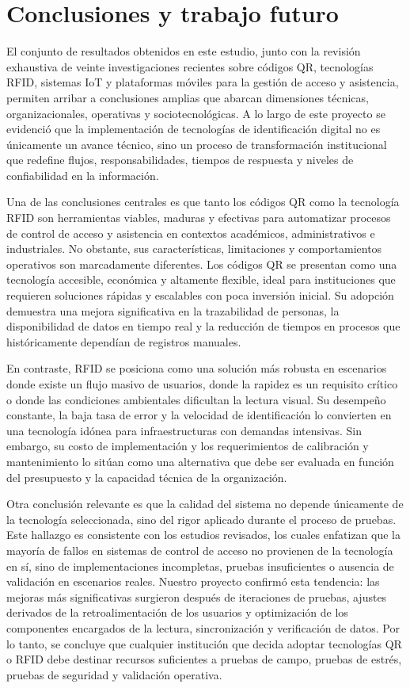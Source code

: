 \section{Conclusiones y trabajo futuro}
El conjunto de resultados obtenidos en este estudio, junto con la revisión exhaustiva de veinte investigaciones recientes sobre códigos QR, tecnologías RFID, sistemas IoT y plataformas móviles para la gestión de acceso y asistencia, permiten arribar a conclusiones amplias que abarcan dimensiones técnicas, organizacionales, operativas y sociotecnológicas. A lo largo de este proyecto se evidenció que la implementación de tecnologías de identificación digital no es únicamente un avance técnico, sino un proceso de transformación institucional que redefine flujos, responsabilidades, tiempos de respuesta y niveles de confiabilidad en la información.

Una de las conclusiones centrales es que tanto los códigos QR como la tecnología RFID son herramientas viables, maduras y efectivas para automatizar procesos de control de acceso y asistencia en contextos académicos, administrativos e industriales. No obstante, sus características, limitaciones y comportamientos operativos son marcadamente diferentes. Los códigos QR se presentan como una tecnología accesible, económica y altamente flexible, ideal para instituciones que requieren soluciones rápidas y escalables con poca inversión inicial. Su adopción demuestra una mejora significativa en la trazabilidad de personas, la disponibilidad de datos en tiempo real y la reducción de tiempos en procesos que históricamente dependían de registros manuales.

En contraste, RFID se posiciona como una solución más robusta en escenarios donde existe un flujo masivo de usuarios, donde la rapidez es un requisito crítico o donde las condiciones ambientales dificultan la lectura visual. Su desempeño constante, la baja tasa de error y la velocidad de identificación lo convierten en una tecnología idónea para infraestructuras con demandas intensivas. Sin embargo, su costo de implementación y los requerimientos de calibración y mantenimiento lo sitúan como una alternativa que debe ser evaluada en función del presupuesto y la capacidad técnica de la organización.

Otra conclusión relevante es que la calidad del sistema no depende únicamente de la tecnología seleccionada, sino del rigor aplicado durante el proceso de pruebas. Este hallazgo es consistente con los estudios revisados, los cuales enfatizan que la mayoría de fallos en sistemas de control de acceso no provienen de la tecnología en sí, sino de implementaciones incompletas, pruebas insuficientes o ausencia de validación en escenarios reales. Nuestro proyecto confirmó esta tendencia: las mejoras más significativas surgieron después de iteraciones de pruebas, ajustes derivados de la retroalimentación de los usuarios y optimización de los componentes encargados de la lectura, sincronización y verificación de datos. Por lo tanto, se concluye que cualquier institución que decida adoptar tecnologías QR o RFID debe destinar recursos suficientes a pruebas de campo, pruebas de estrés, pruebas de seguridad y validación operativa.

